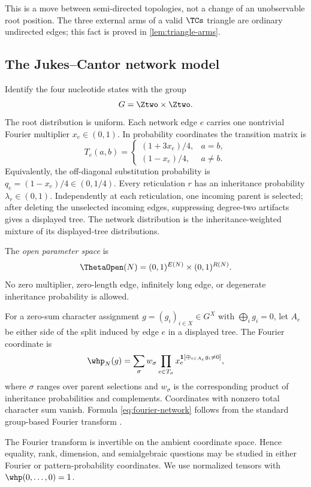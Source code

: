 This is a move between semi-directed topologies, not a change of an unobservable root position.  The three external arms of a valid $\TCs$ triangle are ordinary undirected edges; this fact is proved in \cref{lem:triangle-arms}.

\subsection{The Jukes--Cantor network model}

Identify the four nucleotide states with the group
\[
G=\Ztwo\times\Ztwo.
\]
The root distribution is uniform.  Each network edge $e$ carries one nontrivial Fourier multiplier $x_e\in(0,1)$.  In probability coordinates the transition matrix is
\[
T_e(a,b)=
\begin{cases}
(1+3x_e)/4,&a=b,\\
(1-x_e)/4,&a\ne b.
\end{cases}
\]
Equivalently, the off-diagonal substitution probability is $q_e=(1-x_e)/4\in(0,1/4)$.  Every reticulation $r$ has an inheritance probability $\lambda_r\in(0,1)$.  Independently at each reticulation, one incoming parent is selected; after deleting the unselected incoming edges, suppressing degree-two artifacts gives a displayed tree.  The network distribution is the inheritance-weighted mixture of its displayed-tree distributions.

The \emph{open parameter space} is
\[
\ThetaOpen(N)=(0,1)^{E(N)}\times(0,1)^{R(N)}.
\]
No zero multiplier, zero-length edge, infinitely long edge, or degenerate inheritance probability is allowed.

For a zero-sum character assignment $g=(g_i)_{i\in X}\in G^X$ with $\bigoplus_i g_i=0$, let $A_e$ be either side of the split induced by edge $e$ in a displayed tree.  The Fourier coordinate is
\begin{equation}\label{eq:fourier-network}
\whp_N(g)=
\sum_{\sigma}w_\sigma
\prod_{e\in T_\sigma}
 x_e^{\mathbf 1[\oplus_{i\in A_e}g_i\ne0]},
\end{equation}
where $\sigma$ ranges over parent selections and $w_\sigma$ is the corresponding product of inheritance probabilities and complements.  Coordinates with nonzero total character sum vanish.  Formula \eqref{eq:fourier-network} follows from the standard group-based Fourier transform \cite{EvansSpeed1993,SturmfelsSullivant2005,Sullivant2018}.

The Fourier transform is invertible on the ambient coordinate space.  Hence equality, rank, dimension, and semialgebraic questions may be studied in either Fourier or pattern-probability coordinates.  We use normalized tensors with $\whp(0,\ldots,0)=1$.

